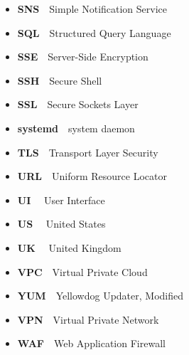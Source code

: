 \begin{itemize}
    \item  \textbf{SNS}~\textemdash~Simple Notification Service
    \item  \textbf{SQL}~\textemdash~Structured Query Language
    \item  \textbf{SSE}~\textemdash~Server-Side Encryption
    \item  \textbf{SSH}~\textemdash~Secure Shell
    \item  \textbf{SSL}~\textemdash~Secure Sockets Layer
    \item  \textbf{systemd}~\textemdash~system daemon
    \item  \textbf{TLS}~\textemdash~Transport Layer Security
    \item  \textbf{URL}~\textemdash~Uniform Resource Locator
    \item  \textbf{UI} ~\textemdash~User Interface
    \item  \textbf{US} ~\textemdash~United States
    \item  \textbf{UK} ~\textemdash~United Kingdom
    \item  \textbf{VPC}~\textemdash~Virtual Private Cloud
    \item  \textbf{YUM}~\textemdash~Yellowdog Updater, Modified
    \item  \textbf{VPN}~\textemdash~Virtual Private Network
    \item  \textbf{WAF}~\textemdash~Web Application Firewall
\end{itemize}